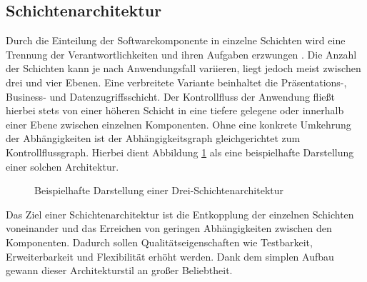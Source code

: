 \subsection{Schichtenarchitektur}

Durch die Einteilung der Softwarekomponente in einzelne Schichten wird eine Trennung der Verantwortlichkeiten und ihren Aufgaben erzwungen \cite[S. 185]{Buschmann.2011}. Die Anzahl der Schichten kann je nach Anwendungsfall variieren, liegt jedoch meist zwischen drei und vier Ebenen. Eine verbreitete Variante beinhaltet die Präsentations-, Business- und Datenzugriffsschicht. Der Kontrollfluss der Anwendung fließt hierbei stets von einer höheren Schicht in eine tiefere gelegene oder innerhalb einer Ebene zwischen einzelnen Komponenten. Ohne eine konkrete Umkehrung der Abhängigkeiten ist der Abhängigkeitsgraph gleichgerichtet zum Kontrollflussgraph. \cite[S. 17]{Fowler.2011} Hierbei dient Abbildung \ref{fig:Schichtenarchitektur} als eine beispielhafte Darstellung einer solchen Architektur. 

\begin{figure}[htbp]
	\centering
	\large
	
	\caption{Beispielhafte Darstellung einer Drei-Schichtenarchitektur}
	\label{fig:Schichtenarchitektur}
\end{figure}

Das Ziel einer Schichtenarchitektur ist die Entkopplung der einzelnen Schichten voneinander und das Erreichen von geringen Abhängigkeiten zwischen den Komponenten. Dadurch sollen Qualitätseigenschaften wie Testbarkeit, Erweiterbarkeit und Flexibilität erhöht werden. Dank dem simplen Aufbau gewann dieser Architekturstil an großer Beliebtheit. 

